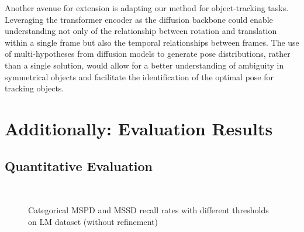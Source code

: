 \documentclass[12pt,DIV14,BCOR12mm,a4paper,footinclude=false,headinclude,parskip=half-,twoside,openright,cleardoublepage=empty,toc=index,bibliography=totoc,listof=totoc]{scrreprt}
\numberwithin{equation}{chapter}
\begin{document}
Another avenue for extension is adapting our method for object-tracking tasks. Leveraging the transformer encoder as the diffusion backbone could enable understanding not only of the relationship between rotation and translation within a single frame but also the temporal relationships between frames. The use of multi-hypotheses from diffusion models to generate pose distributions, rather than a single solution, would allow for a better understanding of ambiguity in symmetrical objects and facilitate the identification of the optimal pose for tracking objects.



\appendix
\chapter{Additionally: Evaluation Results}
\section{Quantitative Evaluation}
\begin{figure}[H]
	\centering
	\\
  \centering
	\caption{Categorical MSPD and MSSD recall rates with different thresholds on LM dataset (without refinement)}
	\label{img:eval_threshold}
\end{figure}
\end{document}
